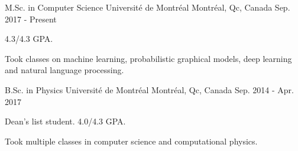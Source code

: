 \begin{cventries}
  \cventry
    {M.Sc. in Computer Science}
    {Universit\'e de Montr\'eal}
    {Montr\'eal, Qc, Canada}
    {Sep. 2017 - Present}
    {
      \begin{cvitems}
        \item {4.3/4.3 GPA.}
        \item {Took classes on machine learning, probabilistic graphical models, deep learning and natural language processing.}
      \end{cvitems}
    }

  \cventry
    {B.Sc. in Physics}
    {Universit\'e de Montr\'eal}
    {Montr\'eal, Qc, Canada}
    {Sep. 2014 - Apr. 2017}
    {
      \begin{cvitems}
        \item {Dean's list student. 4.0/4.3 GPA.}
        \item {Took multiple classes in computer science and computational physics.}
      \end{cvitems}
    }
\end{cventries}
